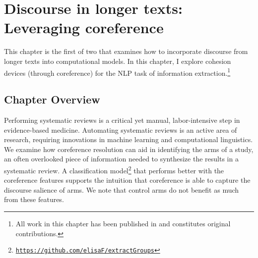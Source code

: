 \chapter{Discourse in longer texts: Leveraging coreference}
\label{ch:longertexts1}
This chapter is the first of two that examines how to incorporate discourse from longer texts into computational models. In this chapter, I explore cohesion devices (through coreference) for the NLP task of information extraction.\footnote{All work in this chapter has been published in  and constitutes original contributions.}

\section{Chapter Overview}
Performing systematic reviews is a critical yet manual, labor-intensive step in evidence-based medicine. Automating systematic reviews is an active area of research, requiring innovations in machine learning and computational linguistics. We examine how coreference resolution can aid in identifying the arms of a study, an often overlooked piece of information needed to synthesize the results in a systematic review. A classification model\footnote{\href{http://github.com/elisaF/extractGroups}{\tt{https://github.com/elisaF/extractGroups}}} that performs better with the coreference features supports the intuition that coreference is able to capture the discourse salience of arms. We note that control arms do not benefit as much from these features. 


